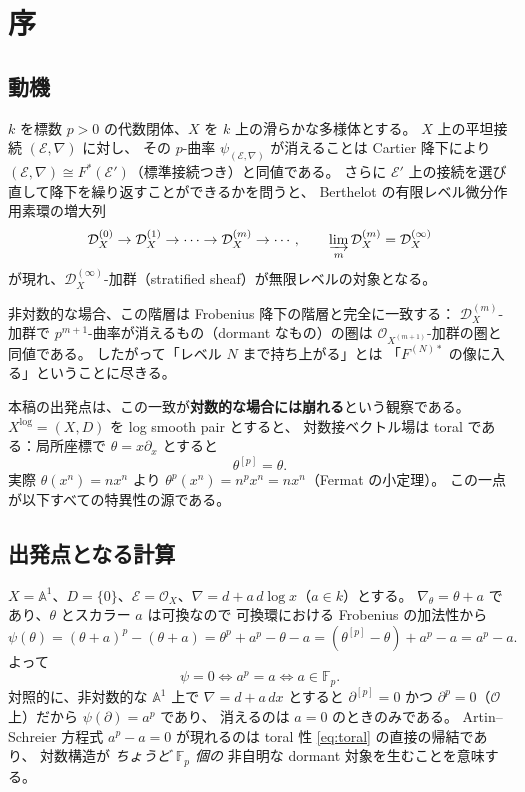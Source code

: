 \documentclass[a4paper,11pt]{ltjsarticle}
\theoremstyle{plain}
\theoremstyle{definition}
\newcommand{\bbA}{\mathbb{A}}
\newcommand{\bbF}{\mathbb{F}}
\newcommand{\cD}{\mathcal{D}}
\newcommand{\cE}{\mathcal{E}}
\newcommand{\cO}{\mathcal{O}}
\newcommand{\dlog}{d\!\log}
\begin{document}
\tableofcontents

\section{序}\label{sec:intro}

\subsection{動機}

$k$ を標数 $p>0$ の代数閉体、$X$ を $k$ 上の滑らかな多様体とする。
$X$ 上の平坦接続 $(\cE,\nabla)$ に対し、
その $p$-曲率 $\psi_{(\cE,\nabla)}$ が消えることは
Cartier 降下により $(\cE,\nabla)\cong F^{*}(\cE')$（標準接続つき）と同値である。
さらに $\cE'$ 上の接続を選び直して降下を繰り返すことができるかを問うと、
Berthelot \cite{Ber1} の有限レベル微分作用素環の増大列
\[
  \cD^{(0)}_X\to\cD^{(1)}_X\to\cdots\to\cD^{(m)}_X\to\cdots,
  \qquad \varinjlim_m\cD^{(m)}_X=\cD^{(\infty)}_X
\]
が現れ、$\cD^{(\infty)}_X$-加群（stratified sheaf）が無限レベルの対象となる。

非対数的な場合、この階層は Frobenius 降下の階層と完全に一致する：
$\cD^{(m)}_X$-加群で $p^{m+1}$-曲率が消えるもの（dormant なもの）の圏は
$\cO_{X^{(m+1)}}$-加群の圏と同値である。
したがって「レベル $N$ まで持ち上がる」とは
「$F^{(N)*}$ の像に入る」ということに尽きる。

本稿の出発点は、この一致が\textbf{対数的な場合には崩れる}という観察である。
$X^{\log}=(X,D)$ を log smooth pair とすると、
対数接ベクトル場は toral である：局所座標で $\theta=x\partial_x$ とすると
\begin{equation}\label{eq:toral}
  \theta^{[p]}=\theta .
\end{equation}
実際 $\theta(x^n)=nx^n$ より $\theta^p(x^n)=n^px^n=nx^n$（Fermat の小定理）。
この一点が以下すべての特異性の源である。

\subsection{出発点となる計算}\label{ss:starting}

$X=\bbA^1$、$D=\{0\}$、$\cE=\cO_X$、$\nabla=d+a\,\dlog x$（$a\in k$）とする。
$\nabla_\theta=\theta+a$ であり、$\theta$ とスカラー $a$ は可換なので
可換環における Frobenius の加法性から
\begin{equation}\label{eq:AS}
  \psi(\theta)=(\theta+a)^p-(\theta+a)
  =\theta^p+a^p-\theta-a
  =(\theta^{[p]}-\theta)+a^p-a
  =a^p-a .
\end{equation}
よって
\[
  \psi=0\iff a^p=a\iff a\in\bbF_p .
\]
対照的に、非対数的な $\bbA^1$ 上で $\nabla=d+a\,dx$ とすると
$\partial^{[p]}=0$ かつ $\partial^p=0$（$\cO$ 上）だから $\psi(\partial)=a^p$ であり、
消えるのは $a=0$ のときのみである。
Artin--Schreier 方程式 $a^p-a=0$ が現れるのは
toral 性 \eqref{eq:toral} の直接の帰結であり、
対数構造が \emph{ちょうど $\bbF_p$ 個の} 非自明な dormant 対象を生むことを意味する。
\end{document}

